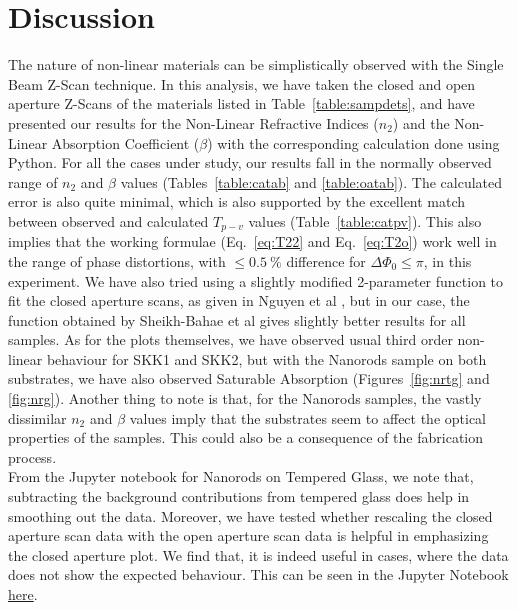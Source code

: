 \documentclass[%
 reprint,
amsmath,
amssymb,
10pt
]{revtex4-2}
\begin{document}
\section{\label{dis}Discussion}
The nature of non-linear materials can be simplistically observed with the Single Beam Z-Scan technique. In this analysis, we have taken the closed and open aperture Z-Scans of the materials listed in Table~\ref{table:sampdets}, and have presented our results for the Non-Linear Refractive Indices ($n_2$) and the Non-Linear Absorption Coefficient ($\beta$) with the corresponding calculation done using Python. For all the cases under study, our results fall in the normally observed range of $n_2$ and $\beta$ values (Tables~\ref{table:catab} and \ref{table:oatab}). The calculated error is also quite minimal, which is also supported by the excellent match between observed and calculated $T_{p-v}$ values (Table~\ref{table:catpv}). This also implies that the working formulae (Eq.~\ref{eq:T22} and Eq.~\ref{eq:T2o}) work well in the range of phase distortions, with $\le0.5\:\%$ difference for $\Delta\Phi_0 \le \pi$, in this experiment. We have also tried using a slightly modified 2-parameter function to fit the closed aperture scans, as given in Nguyen et al \cite{nguyen}, but in our case, the function obtained by Sheikh-Bahae et al \cite{bahae} gives slightly better results for all samples. As for the plots themselves, we have observed usual third order non-linear behaviour for SKK1 and SKK2, but with the Nanorods sample on both substrates, we have also observed Saturable Absorption (Figures~\ref{fig:nrtg} and \ref{fig:nrg}). Another thing to note is that, for the Nanorods samples, the vastly dissimilar $n_2$ and $\beta$ values imply that the substrates seem to affect the optical properties of the samples. This could also be a consequence of the fabrication process.\\

From the Jupyter notebook for Nanorods on Tempered Glass, we note that, subtracting the background contributions from tempered glass does help in smoothing out the data. Moreover, we have tested whether rescaling the closed aperture scan data with the open aperture scan data is helpful in emphasizing the closed aperture plot. We find that, it is indeed useful in cases, where the data does not show the expected behaviour. This can be seen in the Jupyter Notebook \href{https://github.com/JeS24/z_scan/blob/main/notebooks/NanoRods\%20on\%20TG\%20-\%20Rescaling.ipynb}{here}.\\
\end{document}
